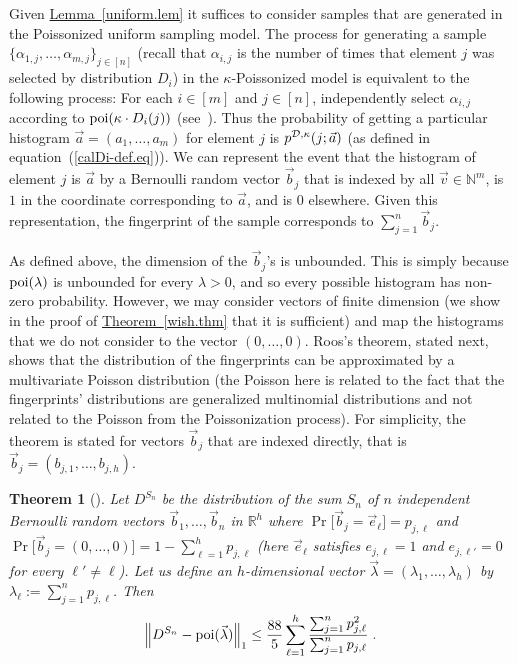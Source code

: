 \documentclass[10pt]{article}
\newtheorem{theorem}{Theorem}[section]
\theoremstyle{definition}
\numberwithin{equation}{section}
\newcommand{\expref}[2]{\texorpdfstring{\hyperref[#2]{#1~\ref{#2}}}{#1~\ref{#2}}}
\newcommand{\poi}{{\rm poi}}
\newcommand{\calD}{{\cal D}}
\newcommand{\BEQ}{\begin{equation}} \newcommand{\EEQ}{\end{equation}}
\newcommand{\w}{\kappa}
\begin{document}
{\medskip
Given \expref{Lemma}{uniform.lem} it suffices to consider samples that are
%
generated in the Poissonized uniform sampling model. The process for generating a
sample $\{\alpha_{1,j}, \ldots, \alpha_{m,j}\}_{j\in[n]}$ (recall that $\alpha_{i,j}$ is the number of times that
element $j$ was selected by distribution $D_i$) in the $\w$-Poissonized model
is equivalent
%
to the following process: For each $i \in [m]$
and $j \in [n]$, independently select $\alpha_{i,j}$ according
to $\poi(\w\cdot D_i(j))$ (see~\cite[p. 216]{feller}). Thus the probability
of getting a particular histogram $\vec{a} = (a_{1},\ldots,a_{m})$
for element $j$ is $p^{\calD,\w}(j;\vec{a})$ (as defined in
equation~(\ref{calDi-def.eq})). We can represent the event that
the histogram of element $j$ is $\vec{a}$ by
a Bernoulli random vector $\vec{b}_j$ that is indexed by all $\vec{v}\in \mathbb{N}^m$, is $1$
in the coordinate corresponding to $\vec{a}$, and is $0$ elsewhere.
Given this representation, the fingerprint of the sample corresponds
to $\sum_{j=1}^n \vec{b}_j$.

As defined above, the dimension of the $\vec{b}_j$'s is unbounded.
This is simply because
$\poi(\lambda)$ is unbounded for every $\lambda > 0$, and so every
possible histogram has non-zero probability.
However, we may consider
vectors of finite dimension (we show in the proof of \expref{Theorem}{wish.thm}
that it is sufficient) and map the histograms that we do not consider to
the vector $(0,\ldots, 0)$.
Roos's theorem, stated next, shows
that the distribution of the fingerprints can be approximated by a multivariate
Poisson distribution (the Poisson here is related to the fact that the fingerprints' distributions are generalized multinomial distributions and not related to the Poisson from the Poissonization process). For simplicity, the theorem is stated for
vectors $\vec{b}_j$ that are indexed directly, that is
$\vec{b}_j = (b_{j,1},\ldots,b_{j,h})$.
%
\begin{theorem}[\cite{roos}] \label{roos.thm}
Let $D^{S_n}$ be the distribution of the sum $S_n$ of $n$ independent
Bernoulli random vectors $\vec{b}_1, \ldots, \vec{b}_n$ in $\mathbb{R}^h$
where $\Pr\bigl[\vec{b}_j = \vec{e}_\ell\bigr] = p_{j,\ell}$ and
$\Pr\bigl[\vec{b}_j = (0,\ldots, 0)\bigr] = 1 - \sum_{\ell=1}^h p_{j,\ell}$
(here $\vec{e}_\ell$ satisfies $e_{j,\ell} = 1$ and $e_{j,\ell'}=0$ for
every $\ell' \neq \ell$).
%
Let us  %
define an $h$-dimensional vector
$\vec{\lambda} = (\lambda_1,\ldots,\lambda_h)$
%
%
by %
 $\lambda_\ell := \sum_{j=1}^n p_{j,\ell}$.
Then
\BEQ\label{DSn-poi.eq}
\left\|D^{S_n} - \poi(\vec{\lambda})\right\|_1
    \leq \frac{88}{5} \sum_{\ell=1}^h \frac{\sum_{j=1}^n p_{j,\ell}^2}
       {\sum_{j=1}^n p_{j,\ell}} \; .
\EEQ
\end{theorem}

}
\end{document}
